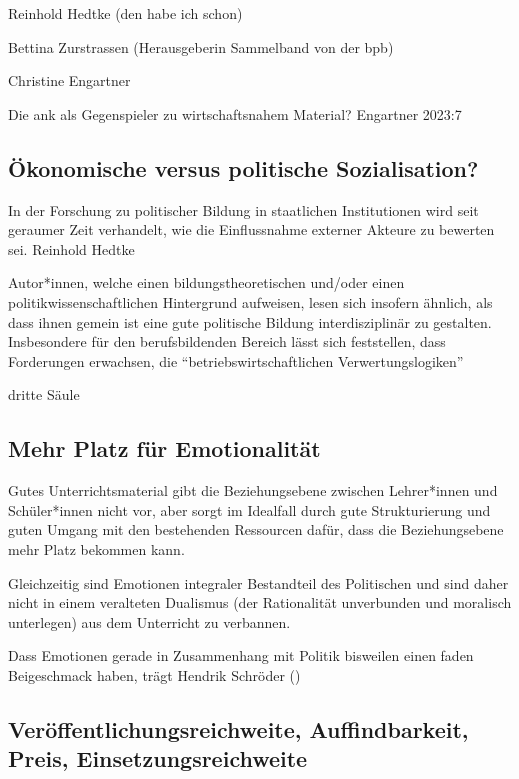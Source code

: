 Reinhold Hedtke (den habe ich schon)

Bettina Zurstrassen (Herausgeberin Sammelband von der bpb) 

Christine Engartner



Die \gls{ank} als Gegenspieler zu wirtschaftsnahem Material? Engartner 2023:7

\subsection{Ökonomische versus politische Sozialisation?}
In der Forschung zu politischer Bildung in staatlichen Institutionen wird seit geraumer Zeit verhandelt, wie die Einflussnahme externer Akteure zu bewerten sei. Reinhold Hedtke 

Autor*innen, welche einen bildungstheoretischen und/oder einen politikwissenschaftlichen Hintergrund aufweisen, lesen sich insofern ähnlich, als dass ihnen gemein ist eine gute politische Bildung interdisziplinär zu gestalten. Insbesondere für den berufsbildenden Bereich lässt sich feststellen, dass Forderungen erwachsen, die \enquote{betriebswirtschaftlichen Verwertungslogiken}

dritte Säule \autocite[]{kerschensteiner1966}


\subsection{Mehr Platz für Emotionalität}
Gutes Unterrichtsmaterial gibt die Beziehungsebene zwischen Lehrer*innen und Schüler*innen nicht vor, aber sorgt im Idealfall durch gute Strukturierung und guten Umgang mit den bestehenden Ressourcen dafür, dass die Beziehungsebene mehr Platz bekommen kann.

Gleichzeitig sind Emotionen integraler Bestandteil des Politischen \autocite{Heidenreich.2012a} und sind daher nicht in einem veralteten Dualismus (der Rationalität unverbunden und moralisch unterlegen) aus dem Unterricht zu verbannen. %

Dass Emotionen gerade in Zusammenhang mit Politik bisweilen einen faden Beigeschmack haben, trägt Hendrik Schröder (\citeyear[4-5]{Schroder.2020}) 



\subsection{Veröffentlichungsreichweite, Auffindbarkeit, Preis, Einsetzungsreichweite \label{öffi}}

